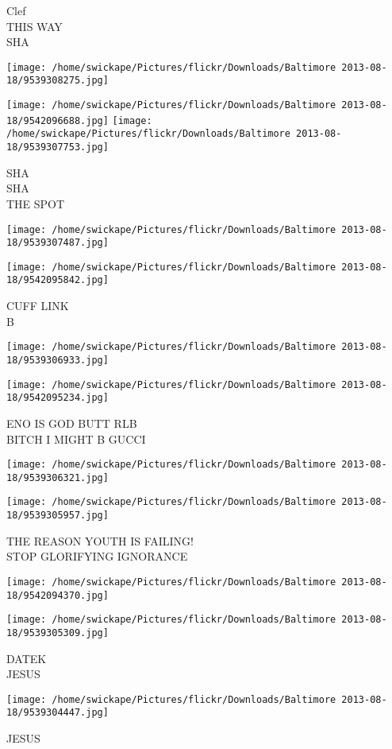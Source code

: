 \documentclass[10pt,letterpaper]{article}
\begin{document}
Clef\\
THIS WAY\\
SHA
\pagebreak

\texttt{[image: /home/swickape/Pictures/flickr/Downloads/Baltimore 2013-08-18/9539308275.jpg]}

\vspace{0.25in}
\texttt{[image: /home/swickape/Pictures/flickr/Downloads/Baltimore 2013-08-18/9542096688.jpg]}
\texttt{[image: /home/swickape/Pictures/flickr/Downloads/Baltimore 2013-08-18/9539307753.jpg]}

SHA\\
SHA\\
THE SPOT
\pagebreak

\texttt{[image: /home/swickape/Pictures/flickr/Downloads/Baltimore 2013-08-18/9539307487.jpg]}

\vspace{0.25in}
\texttt{[image: /home/swickape/Pictures/flickr/Downloads/Baltimore 2013-08-18/9542095842.jpg]}

CUFF LINK\\
B
\pagebreak

\texttt{[image: /home/swickape/Pictures/flickr/Downloads/Baltimore 2013-08-18/9539306933.jpg]}

\vspace{0.25in}
\texttt{[image: /home/swickape/Pictures/flickr/Downloads/Baltimore 2013-08-18/9542095234.jpg]}

ENO IS GOD BUTT RLB\\
BITCH I MIGHT B GUCCI
\pagebreak

\texttt{[image: /home/swickape/Pictures/flickr/Downloads/Baltimore 2013-08-18/9539306321.jpg]}

\vspace{0.25in}
\texttt{[image: /home/swickape/Pictures/flickr/Downloads/Baltimore 2013-08-18/9539305957.jpg]}

THE REASON YOUTH IS FAILING!\\
STOP GLORIFYING IGNORANCE
\pagebreak

\texttt{[image: /home/swickape/Pictures/flickr/Downloads/Baltimore 2013-08-18/9542094370.jpg]}

\vspace{0.25in}
\texttt{[image: /home/swickape/Pictures/flickr/Downloads/Baltimore 2013-08-18/9539305309.jpg]}

DATEK\\
JESUS
\pagebreak

\texttt{[image: /home/swickape/Pictures/flickr/Downloads/Baltimore 2013-08-18/9539304447.jpg]}

JESUS
\pagebreak
\end{document}
